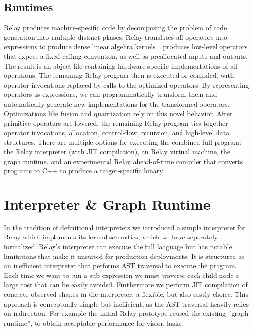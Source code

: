 \subsection{Runtimes}

Relay produces machine-specific code
    by decomposing the problem of code generation into multiple distinct phases.
Relay translates all operators into \tvm expressions
    to produce dense linear algebra kernels~\citep{tvm_osdi18, tensor_comprehensions, halide}.
\tvm produces low-level operators that expect a fixed calling convention,
    as well as preallocated inputs and outputs.
The result is an object file containing hardware-specific implementations of all
    operations.
The remaining Relay program then is executed or compiled,
    with operator invocations replaced by calls to the optimized operators.
By representing operators as \tvm expressions, we can programmatically
    transform them and automatically generate new implementations for the transformed operators.
Optimizations like fusion and quantization
    rely on this novel behavior.
After primitive operators are lowered,
    the remaining Relay program ties
    together operator invocations, allocation, control-flow,
    recursion, and high-level data structures.
There are multiple options for executing the combined full program:
    the Relay interpreter (with JIT compilation),
    an Relay virtual machine,
    the \tvm graph runtime,
    and an experimental Relay ahead-of-time compiler
    that converts programs to C++ to produce a target-specific binary.

\section{Interpreter \& Graph Runtime}
\label{sec:interp_graph_rt}

In the tradition of definitional interpreters we introduced
  a simple interpreter for Relay which implements its formal semantics, which
  we have separately formalized.
Relay’s interpreter can execute the full language but has notable limitations
  that make it unsuited for production deployments.
It is structured as an inefficient interpreter that performs
  AST traversal to execute the program.
Each time we want to run a sub-expression we must traverse each child node
  a large cost that can be easily avoided.
Furthermore we perform JIT compilation of concrete observed shapes in the
  interpreter, a flexible, but also costly choice.
This approach is conceptually simple but inefficient, as the AST traversal heavily relies on indirection.
For example the initial Relay prototype reused the existing ``graph runtime'', to obtain
  acceptable performance for vision tasks.

